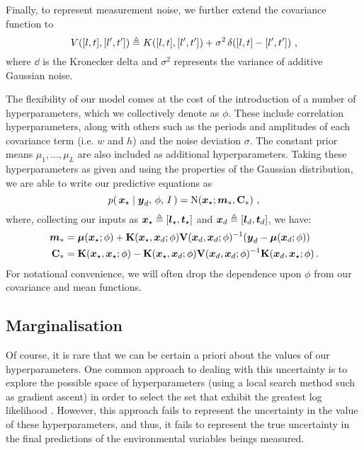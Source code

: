 \documentclass{acmsmall}
\begin{document}
Finally, to represent measurement noise, we further extend the covariance function to
\begin{equation*}
V([l,t],[l',t'])\triangleq K([l,t],[l',t'])+ \sigma^2\,\delta\!\left([l,t]-[l',t']\right)\,,
\end{equation*}
where $\dd{}{}$ is the Kronecker delta and $\sigma^2$ represents the variance of additive Gaussian noise.

The flexibility of our model comes at the cost of the introduction of a number of hyperparameters, which we collectively denote as $\phi$. These include correlation hyperparameters, along with others such as the periods and amplitudes of each covariance term (i.e. $w$ and $h$) and the noise deviation $\sigma$. The constant prior means $\mu_1,\ldots,\mu_L$ are also included as additional hyperparameters. Taking these hyperparameters as given and using the properties of the Gaussian distribution, we are able to write our predictive equations as
\begin{equation} \label{eq:GPMeanVar}
\p{\vxst}{\vyD,\,\phi,\,I}=\N{\vxst}{\vect{m}_\ast}{\mat{C}_\ast}\,,
\end{equation}
where, collecting our inputs as $\boldsymbol{x}_\star\triangleq[\boldsymbol{l}_\star,\boldsymbol{t}_\star]$ and $\boldsymbol{x}_d\triangleq[\boldsymbol{l}_d,\boldsymbol{t}_d]$, we have:
\begin{align} 
\vect{m}_\ast&=\vmu(\vxst;\phi)+\mat{K}(\vxst,\vxD;\phi)\mat{V}(\vxD,\vxD;\phi)^{-1}(\vyD-\vect{\mu}(\vxD;\phi))\label{eq:GPMean}\\
\mat{C}_\ast&=\mat{K}(\vxst,\vxst;\phi)-\mat{K}(\vxst,\vxD;\phi)\mat{V}(\vxD,\vxD;\phi)^{-1}\mat{K}(\vxD,\vxst;\phi)\label{eq:GPVar}\,.
\end{align}
For notational convenience, we will often drop the dependence upon $\phi$ from our covariance and mean functions.

\subsection{Marginalisation}

\noindent Of course, it is rare that we can be certain a priori about the values of our hyperparameters. One common approach to dealing with this uncertainty is to explore the possible space of hyperparameters (using a local search method such as gradient ascent) in order to select the set that exhibit the greatest log likelihood \cite{GPsBook}. However, this approach fails to represent the uncertainty in the value of these hyperparameters, and thus, it fails to represent the true uncertainty in the final predictions of the environmental variables beings measured.
\end{document}
